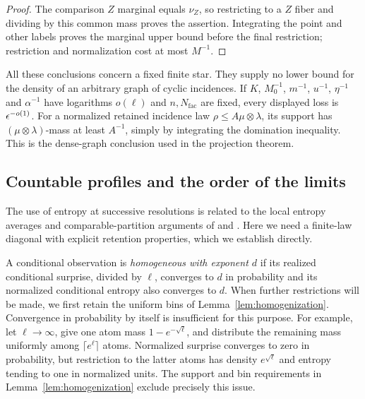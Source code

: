 \begin{proof}
The comparison $Z$ marginal equals $\nu_Z$, so restricting to a
$Z$ fiber and dividing by this common mass proves the assertion.
Integrating the point and other
labels proves the marginal upper bound before the final restriction;
restriction and normalization cost at most $M^{-1}$.
\end{proof}

All these conclusions concern a fixed finite star.  They supply no
lower bound for the density of an arbitrary graph of cyclic incidences.
If $K$, $M_0^{-1}$, $m^{-1}$, $u^{-1}$, $\eta^{-1}$ and $\alpha^{-1}$ have
logarithms $o(\ell)$ and $n,N_{\mathrm{fac}}$ are fixed, every displayed loss is
$\epsilon^{-o(1)}$.  For a normalized retained incidence law
$\rho\le A\mu\otimes\lambda$, its support has
$(\mu\otimes\lambda)$-mass at least $A^{-1}$, simply by integrating
the domination inequality.  This is the dense-graph conclusion used
in the projection theorem.

\subsection{Countable profiles and the order of the limits}

The use of entropy at successive resolutions is related to the local
entropy averages and comparable-partition arguments of
\citet[Sections~3.3 and~4.2]{HochmanShmerkin2012} and
\citet[Section~3]{Hochman2014}.
Here we need a finite-law diagonal with explicit retention properties,
which we establish directly.

A conditional observation is \emph{homogeneous with exponent $d$}
if its realized conditional surprise, divided by $\ell$, converges
to $d$ in probability and its normalized conditional entropy also
converges to $d$.  When further restrictions will be made, we first
retain the uniform bins of Lemma~\ref{lem:homogenization}.
Convergence in probability by itself is insufficient for this purpose.
For example, let $\ell\to\infty$, give one atom mass
$1-e^{-\sqrt\ell}$, and distribute the remaining mass uniformly
among $\lceil e^\ell\rceil$ atoms.  Normalized surprise converges
to zero in probability, but restriction to the latter atoms has density
$e^{\sqrt\ell}$ and entropy tending to one in normalized units.
The support and bin requirements in Lemma~\ref{lem:homogenization}
exclude precisely this issue.

